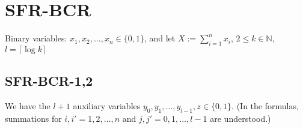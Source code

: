 \documentclass[a4paper,english,notitlepage,longbibliography,showpacs,preprintnumbers,amsmath,amssymb,aps,prx,nofootinbib,12pt,superscriptaddress]{revtex4-1}
\newcommand{\ceil}[1]{\lceil #1 \rceil}
\begin{document}

\section{SFR-BCR}

\noindent Binary variables: $x_1,x_2,\dots,x_n\in\{0,1\}$,
and let $X:=\sum_{i=1}^n x_i$, $2\leq k\in\mathbb{N}$, $l = \ceil{\log k}$

\subsection{SFR-BCR-1,2}
\noindent We have the $l+1$ auxiliary variables $y_0,y_1,\dots,y_{l-1},z\in\{0,1\}$.
(In the formulas, summations for $i,i' = 1,2,\dots,n$ and $j,j' = 0,1,\dots,l-1$ are understood.)\\
\end{document}
